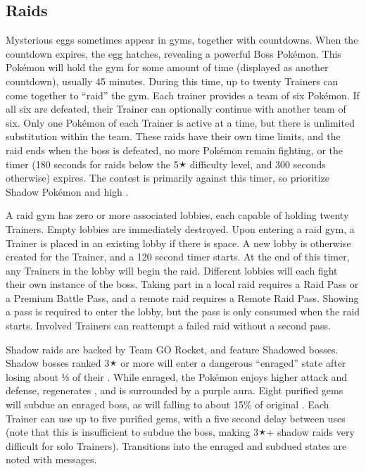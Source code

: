 \subsection{Raids\label{sec:raids}}
Mysterious eggs sometimes appear in gyms, together with countdowns.
When the countdown expires, the egg hatches, revealing a powerful Boss Pokémon.
This Pokémon will hold the gym for some amount of time (displayed as another countdown), usually 45 minutes.
During this time, up to twenty Trainers can come together to ``raid'' the gym.
Each trainer provides a team of six Pokémon.
If all six are defeated, their Trainer can optionally continue with another team of six.
Only one Pokémon of each Trainer is active at a time, but there is unlimited substitution within the team.
These raids have their own time limits, and the raid ends when the boss is defeated, no more Pokémon remain fighting,
  or the timer (180 seconds for raids below the 5🟉 difficulty level, and 300 seconds otherwise) expires.
The contest is primarily against this timer, so prioritize Shadow Pokémon and high .

A raid gym has zero or more associated lobbies, each capable of holding twenty Trainers.
Empty lobbies are immediately destroyed.
Upon entering a raid gym, a Trainer is placed in an existing lobby if there is space.
A new lobby is otherwise created for the Trainer, and a 120 second timer starts.
At the end of this timer, any Trainers in the lobby will begin the raid.
Different lobbies will each fight their own instance of the boss.
Taking part in a local raid requires a Raid Pass or a Premium Battle Pass,
  and a remote raid requires a Remote Raid Pass.
Showing a pass is required to enter the lobby, but the pass is only consumed when the raid starts.
Involved Trainers can reattempt a failed raid without a second pass.

Shadow raids are backed by Team GO Rocket, and feature Shadowed bosses.
Shadow bosses ranked 3🟉 or more will enter a dangerous ``enraged'' state after losing about ⅓ of their \HP.
While enraged, the Pokémon enjoys higher attack and defense, regenerates \HP, and is surrounded by a purple aura.
Eight purified gems will subdue an enraged boss, as will falling to about 15\% of original \HP.
Each Trainer can use up to five purified gems, with a five second delay between uses
 (note that this is insufficient to subdue the boss, making 3🟉+ shadow raids
 very difficult for solo Trainers).
Transitions into the enraged and subdued states are noted with messages.

